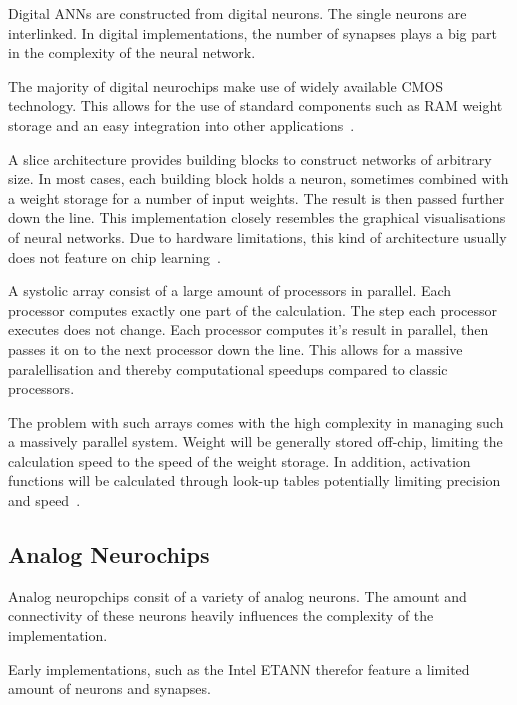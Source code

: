 \documentclass[conference]{IEEEtran}
\begin{document}
    Digital ANNs are constructed from digital neurons.
    The single neurons are interlinked.
    In digital implementations, the number of synapses plays a big part in the complexity of the neural network.

    The majority of digital neurochips make use of widely available CMOS technology.
    This allows for the use of standard components such as RAM weight storage and an easy integration into other applications~\cite{dias2004artificial}.

    A slice architecture provides building blocks to construct networks of arbitrary size.
    In most cases, each building block holds a neuron, sometimes combined with a weight storage for a number of input weights.
    The result is then passed further down the line.
    This implementation closely resembles the graphical visualisations of neural networks.
    Due to hardware limitations, this kind of architecture usually does not feature on chip learning~\cite{dias2004artificial}.

    A systolic array consist of a large amount of processors in parallel.
    Each processor computes exactly one part of the calculation.
    The step each processor executes does not change.
    Each processor computes it's result in parallel, then passes it on to the next processor down the line.
    This allows for a massive paralellisation and thereby computational speedups compared to classic processors.

    The problem with such arrays comes with the high complexity in managing such a massively parallel system.
    Weight will be generally stored off-chip, limiting the calculation speed to the speed of the weight storage.
    In addition, activation functions will be calculated through look-up tables potentially limiting precision and speed~\cite{dias2004artificial}.



    \subsection{Analog Neurochips}

    Analog neuropchips consit of a variety of analog neurons.
    The amount and connectivity of these neurons heavily influences the complexity of the implementation.

    Early implementations, such as the Intel ETANN therefor feature a limited amount of neurons and synapses.
\end{document}
